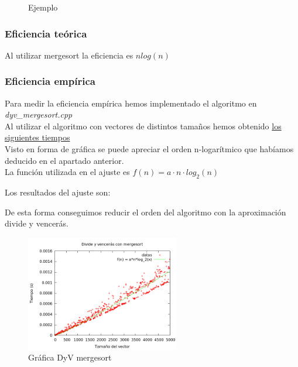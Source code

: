 \begin{figure}[h] 
\centering
	\caption{Ejemplo} 
\end{figure}

\subsubsection{Eficiencia teórica}
Al utilizar mergesort la eficiencia es $nlog(n)$

\subsubsection{Eficiencia empírica}
Para medir la eficiencia empírica hemos implementado el algoritmo en \textit{dyv\_mergesort.cpp}\\

Al utilizar el algoritmo con vectores de distintos tamaños hemos obtenido \hyperref[tabla_comp]{{\color{blue} los siguientes tiempos}}\\

Visto en forma de gráfica se puede apreciar el orden n-logarítmico que habíamos deducido en el apartado anterior.\\

La función utilizada en el ajuste es $f(n) = a \cdot n \cdot log_2(n)$

Los resultados del ajuste son:\\

\begin{center}
\end{center}

De esta forma conseguimos reducir el orden del algoritmo con la aproximación divide y vencerás.

\begin{figure}[h] 
\centering
	\includegraphics[width=0.6\textwidth]{../Opcional/Graficas/dyv_mergesort_bruno.png}
	\caption{Gráfica DyV mergesort} 
	\label{fig:perros} 
\end{figure}
\newpage

